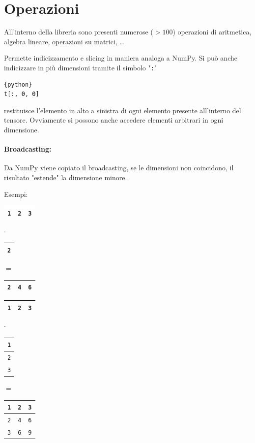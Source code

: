 \section{Operazioni}

All'interno della libreria sono presenti numerose ($> 100$) operazioni di aritmetica, algebra lineare, operazioni su matrici, \dots

Permette indicizzamento e slicing in maniera analoga a NumPy. Si può anche indicizzare in più dimensioni tramite il simbolo "\texttt{:}"
\begin{lstlisting}{python}
t[:, 0, 0]
\end{lstlisting}
restituisce l'elemento in alto a sinistra di ogni elemento presente all'interno del tensore. Ovviamente si possono anche accedere elementi arbitrari in ogni dimensione.

\paragraph{Broadcasting:} Da NumPy viene copiato il broadcasting, se le dimensioni non coincidono, il risultato "estende" la dimensione minore. 

Esempi:
\begin{center}
    \begin{tabular}{| c | c | c |}
        \hline 
        \texttt{1} & \texttt{2} & \texttt{3} \\
        \hline
    \end{tabular}
    $\cdot$
    \begin{tabular}{| c |}
        \hline
        \texttt{2} \\
        \hline 
    \end{tabular}
    $=$ 
    \begin{tabular}{| c | c | c |}
        \hline
        \texttt{2} & \texttt{4} & \texttt{6} \\
        \hline
    \end{tabular}
\end{center}

\begin{center}
    \begin{tabular}{| c | c | c |}
        \hline
        \texttt{1} & \texttt{2} & \texttt{3} \\
        \hline
    \end{tabular}
    $\cdot$
    \begin{tabular}{| c |}
        \hline
        \texttt{1} \\
        \hline
        \texttt{2} \\
        \hline 
        \texttt{3} \\
        \hline
    \end{tabular}
    $=$
    \begin{tabular}{| c | c | c |}
        \hline
        \texttt{1} & \texttt{2} & \texttt{3} \\
        \hline
        \texttt{2} & \texttt{4} & \texttt{6} \\
        \hline
        \texttt{3} & \texttt{6} & \texttt{9} \\
        \hline
    \end{tabular}
\end{center}

